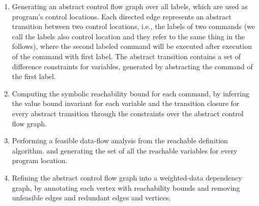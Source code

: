 \begin{enumerate}
    \item Generating an abstract control flow graph over all labels, which are used as program's control locations.
    Each directed edge represents an abstract transition 
     between two control locations, i.e., the labels of two commands (we call the labels also control location and they refer to the same thing in the follows), 
     where the second labeled command will be executed after execution of the command with first label.
     The abstract transition contains a set of difference constraints for variables, generated by abstracting the command of the first label.
    \item Computing 
    the symbolic reachability bound for each command,
    by inferring the value bound invariant for each variable 
    and the transition closure for every abstract transition through the constraints over the abstract control flow graph.
    \item Performing a feasible data-flow analysis from the reachable definition algorithm. 
and generating the set of all the reachable variables for every program location.
\item Refining the abstract control flow graph into a weighted-data dependency graph, 
by annotating each vertex with reachability bounds and 
removing unfeasible edges and redundant edges and vertices.

\end{enumerate}

